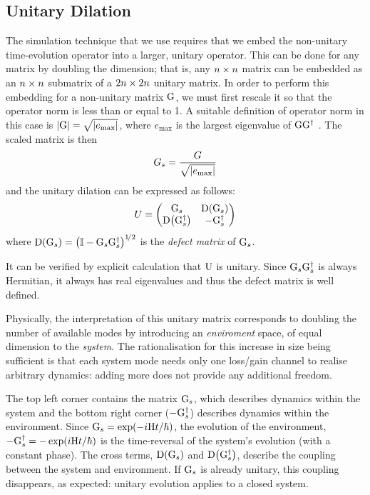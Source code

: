 \subsection{Unitary Dilation}
The simulation technique that we use requires that we embed the non-unitary
time-evolution operator into a larger, unitary operator. This can be done for
any matrix by doubling the dimension; that is, any \(n \times n\) matrix can be
embedded as an \(n \times n\) submatrix of a \(2n \times 2n\) unitary matrix. In order
to perform this embedding for a non-unitary matrix \(\mathrm{G}\), we must first
rescale it so that the operator norm is less than or equal to 1. A suitable
definition of operator norm in this case is \(\left|\mathrm{G}\right| = \sqrt{\left|e_{
\text{max}}\right|}\), where \(e_{\text{max}}\) is the largest eigenvalue of 
\(\mathrm{GG^{\dagger}}\) \cite{dilation}. The scaled matrix is then
\begin{equation}
  G_{s} = \frac{G}{\sqrt{\left|e_{\text{max}}\right|}}
\end{equation}
and the unitary dilation can be expressed as follows:
\begin{equation}
  U = \begin{pmatrix}
    \mathrm{G}_{s} & \mathrm{D}\!\left(\mathrm{G}_{s}\right) \\
    \mathrm{D}\!\left(\mathrm{G}_{s}^{\dagger}\right) & -\mathrm{G}_{s}^{\dagger} \end{pmatrix}
\end{equation}
where \(\mathrm{D}\!\left(\mathrm{G}_{s}\right) = \left( \mathbb{I} - \mathrm{G}_{s}\mathrm{G}_{s}^{
\dagger} \right)^{1\!/2}
\) is the \emph{defect matrix} of \(\mathrm{G}_{s}\).

It can be verified by explicit calculation that \(\mathrm{U}\) is unitary.
Since \(\mathrm{G}_{s}\mathrm{G}_{s}^{\dagger}\) is always Hermitian, it always has
real eigenvalues and thus the defect matrix is well defined.

Physically, the interpretation of this unitary matrix corresponds to doubling
the number of available modes by introducing an \emph{enviroment} space, of
equal dimension to the \emph{system}. The rationalisation for this increase in
size being sufficient is that each system mode needs only one loss/gain channel
to realise arbitrary dynamics: adding more does not provide any additional
freedom.

The top left corner contains the matrix \(\mathrm{G}_{s}\), which describes
dynamics within the system and the bottom right corner
(\(-\mathrm{G}_{s}^{\dagger}\)) describes dynamics within the environment.
Since \(\mathrm{G}_{s}=\exp \!\left(-i\mathrm{H}t/\hbar\right)\), the evolution of the
environment, \(\mathrm{-G}_{s}^{\dagger}=-\exp \!\left(i\mathrm{H}t/\hbar\right)\) is the
time-reversal of the system's evolution (with a constant phase). The cross
terms, \(\mathrm{D} \!\left(\mathrm{G}_{s}\right)\) and \(\mathrm{D} \!\left(\mathrm{G}_{s}^{ \dagger}\right)
\), describe the coupling between the system and environment. If
\(\mathrm{G}_{s}\) is already unitary, this coupling disappears, as expected:
unitary evolution applies to a closed system.


